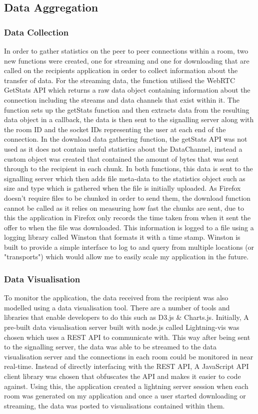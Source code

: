 \documentclass[]{report}
\begin{document}
			\subsection{Data Aggregation}
				\subsubsection{Data Collection}
				In order to gather statistics on the peer to peer connections within a room, two new functions were created, one for streaming and one for downloading that are called on the recipients application in order to collect information about the transfer of data. For the streaming data, the function utilised the WebRTC GetStats API which returns a raw data object containing information about the connection including the streams and data channels that exist within it. The function sets up the getStats function and then extracts data from the resulting data object in a callback, the data is then sent to the signalling server along with the room ID and the socket IDs representing the user at each end of the connection. In the download data gathering function, the getStats API was not used as it does not contain useful statistics about the DataChannel, instead a custom object was created that contained the amount of bytes that was sent through to the recipient in each chunk. In both functions, this data is sent to the signalling server which then adds file meta-data to the statistics object such as size and type which is gathered when the file is initially uploaded. As Firefox doesn't require files to be chunked in order to send them, the download function cannot be called as it relies on measuring how fast the chunks are sent, due to this the application in Firefox only records the time taken from when it sent the offer to when the file was downloaded. This information is logged to a file using a logging library called Winston that formats it with a time stamp. Winston is built to provide a simple interface to log to and query from multiple locations (or "transports") which would allow me to easily scale my application in the future.
				
				\subsubsection{Data Visualisation}
				To monitor the application, the data received from the recipient was also modelled using a data visualisation tool. There are a number of tools and libraries that enable developers to do this such as D3.js \& Charts.js. Initially, A pre-built data visualisation server built with node.js called Lightning-vis was chosen which uses a REST API to communicate with. This way after being sent to the signalling server, the data was able to be streamed to the data visualisation server and the connections in each room could be monitored in near real-time. Instead of directly interfacing with the REST API, A JavaScript API client library was chosen that obfuscates the API and makes it easier to code against. Using this, the application created a lightning server session when each room was generated on my application and once a user started downloading or streaming, the data was posted to visualisations contained within them. 
								
\end{document}

